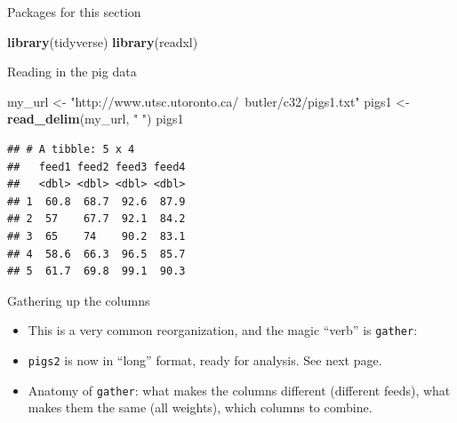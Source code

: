 \documentclass[ignorenonframetext,]{beamer}
\newenvironment{Shaded}{\begin{snugshade}}{\end{snugshade}}
\newcommand{\KeywordTok}[1]{\textcolor[rgb]{0.13,0.29,0.53}{\textbf{#1}}}
\newcommand{\NormalTok}[1]{#1}
\newcommand{\OperatorTok}[1]{\textcolor[rgb]{0.81,0.36,0.00}{\textbf{#1}}}
\newcommand{\StringTok}[1]{\textcolor[rgb]{0.31,0.60,0.02}{#1}}
\providecommand{\tightlist}{%
  \setlength{\itemsep}{0pt}\setlength{\parskip}{0pt}}
\begin{document}
\begin{frame}[fragile]{Packages for this section}
\protect\hypertarget{packages-for-this-section-4}{}

\begin{Shaded}
\begin{Highlighting}[]
\KeywordTok{library}\NormalTok{(tidyverse)}
\KeywordTok{library}\NormalTok{(readxl)}
\end{Highlighting}
\end{Shaded}

\end{frame}

\begin{frame}[fragile]{Reading in the pig data}
\protect\hypertarget{reading-in-the-pig-data}{}

\begin{Shaded}
\begin{Highlighting}[]
\NormalTok{my_url <-}\StringTok{ "http://www.utsc.utoronto.ca/~butler/c32/pigs1.txt"}
\NormalTok{pigs1 <-}\StringTok{ }\KeywordTok{read_delim}\NormalTok{(my_url, }\StringTok{" "}\NormalTok{)}
\NormalTok{pigs1}
\end{Highlighting}
\end{Shaded}

\begin{verbatim}
## # A tibble: 5 x 4
##   feed1 feed2 feed3 feed4
##   <dbl> <dbl> <dbl> <dbl>
## 1  60.8  68.7  92.6  87.9
## 2  57    67.7  92.1  84.2
## 3  65    74    90.2  83.1
## 4  58.6  66.3  96.5  85.7
## 5  61.7  69.8  99.1  90.3
\end{verbatim}

\end{frame}

\begin{frame}[fragile]{Gathering up the columns}
\protect\hypertarget{gathering-up-the-columns}{}

\begin{itemize}
\tightlist
\item
  This is a very common reorganization, and the magic ``verb'' is
  \texttt{gather}:
\end{itemize}

\begin{Shaded}
\end{Shaded}

\begin{itemize}
\tightlist
\item
  \texttt{pigs2} is now in ``long'' format, ready for analysis. See next
  page.
\item
  Anatomy of \texttt{gather}: what makes the columns different
  (different feeds), what makes them the same (all weights), which
  columns to combine.
\end{itemize}

\end{frame}
\end{document}
